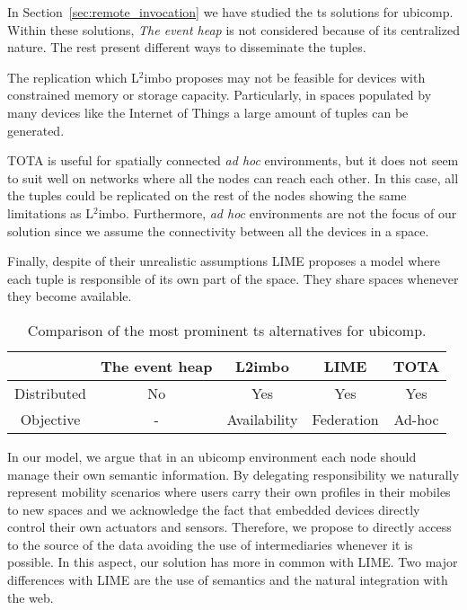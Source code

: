 
In Section~\ref{sec:remote_invocation} we have studied the \ac{ts} solutions for \acl{ubicomp}.
Within these solutions, \emph{The event heap} is not considered because of its centralized nature.
The rest present different ways to disseminate the tuples. %

The replication which L$^2$imbo proposes may not be feasible for devices with constrained memory or storage capacity.
Particularly, in spaces populated by many devices like the Internet of Things a large amount of tuples can be generated.

TOTA is useful for spatially connected \emph{ad hoc} environments, but it does not seem to suit well on networks where all the nodes can reach each other.
In this case, all the tuples could be replicated on the rest of the nodes showing the same limitations as L$^2$imbo.
Furthermore, \emph{ad hoc} environments are not the focus of our solution since we assume the connectivity between all the devices in a space.

Finally, despite of their unrealistic assumptions LIME proposes a model where each tuple is responsible of its own part of the space.
They share spaces whenever they become available.


\begin{table}%
  \centering
  \begin{tabular}{ c | c c c c }%
      ~ & The event heap & L2imbo & LIME & TOTA \\
      \hline
      Distributed & No & Yes & Yes & Yes \\
      Objective & - & Availability & Federation & Ad-hoc \\
  \end{tabular}
  \caption{Comparison of the most prominent \acl{ts} alternatives for \acl{ubicomp}.} %
  \label{tab:ubicomp_ts_comparison}
\end{table}


\medskip

In our model, we argue that in an \ac{ubicomp} environment each node should manage their own semantic information.
By delegating responsibility 
we naturally represent mobility scenarios where users carry their own profiles in their mobiles to new spaces 
and 
we acknowledge the fact that embedded devices directly control their own actuators and sensors.
Therefore, we propose to directly access to the source of the data avoiding the use of intermediaries whenever it is possible.
In this aspect, our solution has more in common with LIME.
Two major differences with LIME are the use of semantics and the natural integration with the web. %